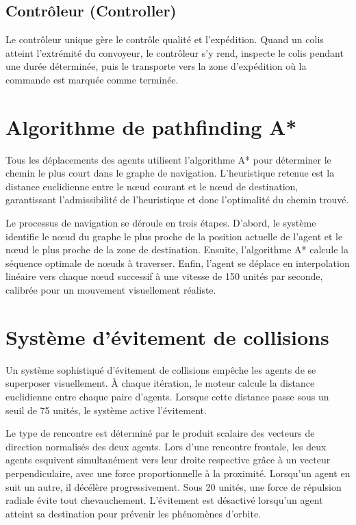\documentclass[12pt,a4paper]{report}
\begin{document}
\subsection{Contr\^oleur (Controller)}

Le contr\^oleur unique g\`ere le contr\^ole qualit\'e et l'exp\'edition. Quand un colis atteint l'extr\'emit\'e du convoyeur, le contr\^oleur s'y rend, inspecte le colis pendant une dur\'ee d\'etermin\'ee, puis le transporte vers la zone d'exp\'edition o\`u la commande est marqu\'ee comme termin\'ee.

\section{Algorithme de pathfinding A*}

Tous les d\'eplacements des agents utilisent l'algorithme A* pour d\'eterminer le chemin le plus court dans le graphe de navigation. L'heuristique retenue est la distance euclidienne entre le n\oe ud courant et le n\oe ud de destination, garantissant l'admissibilit\'e de l'heuristique et donc l'optimalit\'e du chemin trouv\'e.

Le processus de navigation se d\'eroule en trois \'etapes. D'abord, le syst\`eme identifie le n\oe ud du graphe le plus proche de la position actuelle de l'agent et le n\oe ud le plus proche de la zone de destination. Ensuite, l'algorithme A* calcule la s\'equence optimale de n\oe uds \`a traverser. Enfin, l'agent se d\'eplace en interpolation lin\'eaire vers chaque n\oe ud successif \`a une vitesse de 150 unit\'es par seconde, calibr\'ee pour un mouvement visuellement r\'ealiste.

\section{Syst\`eme d'\'evitement de collisions}

Un syst\`eme sophistiqu\'e d'\'evitement de collisions emp\^eche les agents de se superposer visuellement. \`A chaque it\'eration, le moteur calcule la distance euclidienne entre chaque paire d'agents. Lorsque cette distance passe sous un seuil de 75 unit\'es, le syst\`eme active l'\'evitement.

Le type de rencontre est d\'etermin\'e par le produit scalaire des vecteurs de direction normalis\'es des deux agents. Lors d'une rencontre frontale, les deux agents esquivent simultan\'ement vers leur droite respective gr\^ace \`a un vecteur perpendiculaire, avec une force proportionnelle \`a la proximit\'e. Lorsqu'un agent en suit un autre, il d\'ec\'el\`ere progressivement. Sous 20 unit\'es, une force de r\'epulsion radiale \'evite tout chevauchement. L'\'evitement est d\'esactiv\'e lorsqu'un agent atteint sa destination pour pr\'evenir les ph\'enom\`enes d'orbite.
\end{document}
